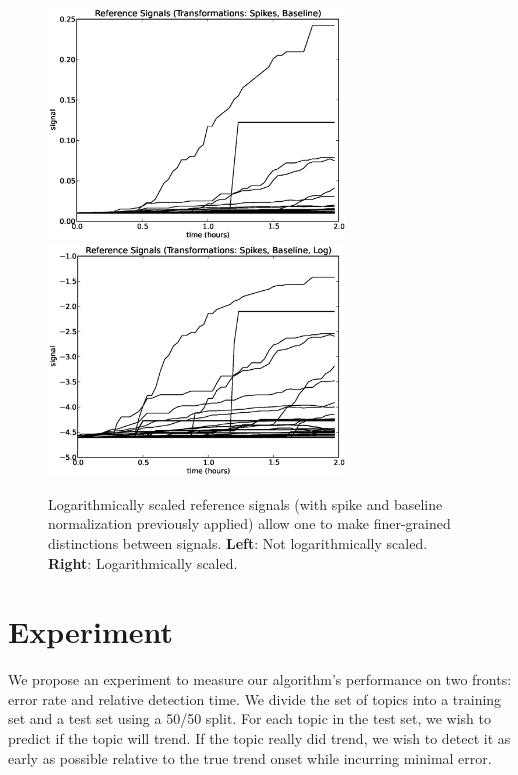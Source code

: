 \begin{figure}[h!]
\begin{center}
\includegraphics[width=3.10in]{../fig/final/signal_transform/no_log.eps}\includegraphics[width=3.1in]{../fig/final/signal_transform/yes_log.eps}
\end{center}
\caption{\label{fig:log} Logarithmically scaled reference signals (with spike and baseline normalization previously applied) allow one to make finer-grained distinctions between signals. {\bf Left}: Not logarithmically scaled. {\bf Right}: Logarithmically scaled.}
\end{figure}

\clearpage

\section{Experiment}
We propose an experiment to measure our algorithm's performance on two fronts:
error rate and relative detection time. We divide the set of topics into a
training set and a test set using a 50/50 split. For each topic in the test
set, we wish to predict if the topic will trend. If the topic really did trend,
we wish to detect it as early as possible relative to the true trend onset while
incurring minimal error.

